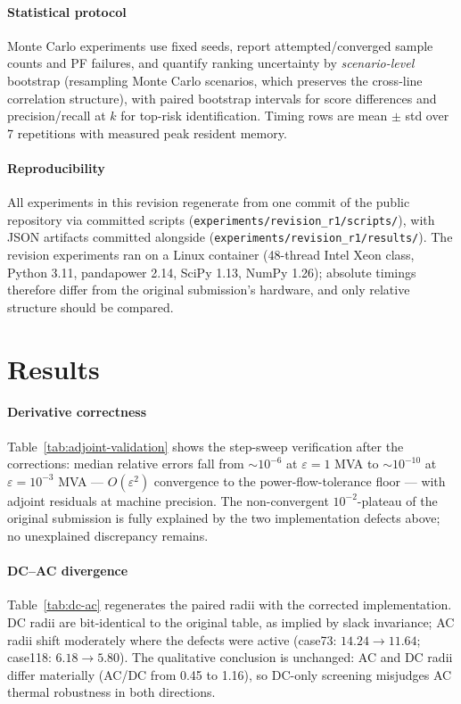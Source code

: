 \documentclass[11pt]{article}
\begin{document}
\paragraph{Statistical protocol}
Monte Carlo experiments use fixed seeds, report attempted/converged sample
counts and PF failures, and quantify ranking uncertainty by
\emph{scenario-level} bootstrap (resampling Monte Carlo scenarios, which
preserves the cross-line correlation structure), with paired bootstrap
intervals for score differences and precision/recall at $k$ for top-risk
identification.  Timing rows are mean $\pm$ std over 7 repetitions with
measured peak resident memory.

\paragraph{Reproducibility}
All experiments in this revision regenerate from one commit of the public
repository via committed scripts
(\texttt{experiments/revision\_r1/scripts/}), with JSON artifacts committed
alongside (\texttt{experiments/revision\_r1/results/}).  The revision
experiments ran on a Linux container (48-thread Intel Xeon class, Python
3.11, pandapower 2.14, SciPy 1.13, NumPy 1.26); absolute timings therefore
differ from the original submission's hardware, and only relative structure
should be compared.

\section{Results}
\label{sec:results}

\paragraph{Derivative correctness}
Table~\ref{tab:adjoint-validation} shows the step-sweep verification after
the corrections: median relative errors fall from $\sim10^{-6}$ at
$\varepsilon=1$ MVA to $\sim10^{-10}$ at $\varepsilon=10^{-3}$ MVA ---
$O(\varepsilon^2)$ convergence to the power-flow-tolerance floor --- with
adjoint residuals at machine precision.  The non-convergent
$10^{-2}$-plateau of the original submission is fully explained by the two
implementation defects above; no unexplained discrepancy remains.



\paragraph{DC--AC divergence}
Table~\ref{tab:dc-ac} regenerates the paired radii with the corrected
implementation.  DC radii are bit-identical to the original table, as
implied by slack invariance; AC radii shift moderately where the defects
were active (case73: $14.24\to11.64$; case118: $6.18\to5.80$).  The
qualitative conclusion is unchanged: AC and DC radii differ materially
(AC/DC from 0.45 to 1.16), so DC-only screening misjudges AC thermal
robustness in both directions.
\end{document}
